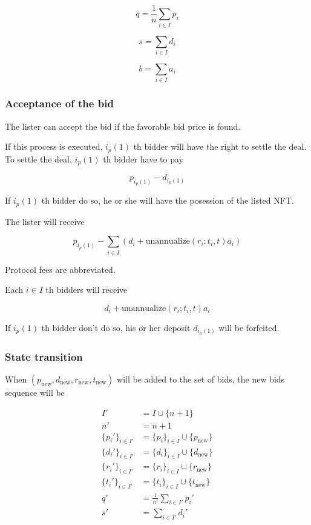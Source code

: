 \documentclass[dvipdfmx]{jsarticle}
\begin{document}
$$
  q = \frac{1}{n} \sum_{i \in I} p_i
$$

$$
  s = \sum_{i \in I} d_i
$$

$$
  b = \sum_{i \in I} a_i
$$

\subsubsection{Acceptance of the bid}

The lister can accept the bid if the favorable bid price is found.

If this process is executed, $i_p(1)$ th bidder will have the right to settle the deal.
To settle the deal, $i_p(1)$ th bidder have to pay

$$
  p_{i_p(1)} - d_{i_p(1)}
$$

If $i_p(1)$ th bidder do so, he or she will have the posession of the listed NFT.

The lister will receive

$$
  p_{i_p(1)} - \sum_{i \in I} \left( d_i + \text{unannualize}(r_i; t_i, t) a_i \right)
$$

Protocol fees are abbreviated.

Each $i \in I$ th bidders will receive

$$
  d_i + \text{unannualize}(r_i; t_i, t) a_i
$$

If $i_p(1)$ th bidder don't do so, his or her deposit $d_{i_p(1)}$ will be forfeited.

\subsubsection{State transition}

When $(p_{\text{new}}, d_{\text{new}}, r_{\text{new}}, t_{\text{new}})$ will be added to the set of bids, the new bids sequence will be

$$
\begin{aligned}
  I' &= I \cup \{n+1\} \\
  n' &= n + 1 \\
  \{p_i'\}_{i \in I'} &= \{p_i\}_{i \in I} \cup \{p_{\text{new}}\} \\
  \{d_i'\}_{i \in I'} &= \{d_i\}_{i \in I} \cup \{d_{\text{new}}\} \\
  \{r_i'\}_{i \in I'} &= \{r_i\}_{i \in I} \cup \{r_{\text{new}}\} \\
  \{t_i'\}_{i \in I'} &= \{t_i\}_{i \in I} \cup \{t_{\text{new}}\} \\
  q' &= \frac{1}{n'} \sum_{i \in I'} p_i' \\
  s' &= \sum_{i \in I'} d_i'
\end{aligned}
$$
\end{document}
